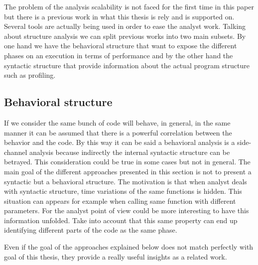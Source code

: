 \documentclass[12pt]{report}
\begin{document}
The problem of the analysis scalability is not faced for the first time in 
this paper but there is a previous work in what this thesis is rely and is 
supported on. Several tools are actually being used in order to ease the analyst
work. Talking about structure analysis we can split previous works into two main
subsets. By one hand we have the behavioral structure that want to expose the
different phases on an execution in terms of performance and by the other hand
the syntactic structure that provide information about the actual program
structure such as profiling.

\subsection{Behavioral structure}

If we consider the same bunch of code will behave, in general, in the same
manner it can be assumed that there is a powerful correlation between the
behavior and the code. By this way it can be said a behavioral analysis is a
side-channel analysis because indirectly the internal syntactic structure can be
betrayed. This consideration could be true in some cases but not in general. The 
main goal of the different approaches presented in this section is not
to present a syntactic but a behavioral structure. The motivation is that when
analyst deals with syntactic structure, time variations of the same functions is
hidden. This situation can appears for example when calling same function with
different parameters. For the analyst point of view could be more interesting to
have this information unfolded. Take into account that this same property can
end up identifying different parts of the code as the same phase.

Even if the goal of the approaches explained below does not match perfectly with
goal of this thesis, they provide a really useful insights as a related work.
\end{document}
